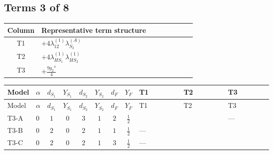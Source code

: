 \documentclass[8pt]{article}
\begin{document}
\begin{landscape}
\subsection*{Terms 3 of 8}
\begin{center}
\begin{tabular}{@{}c >{\raggedright\arraybackslash}p{0.82\linewidth}@{}}
\toprule
Column & Representative term structure \\
\midrule
T1 & \(\displaystyle +4 {\lambda_{12}^{(1)}} {\lambda_{S_2}^{(A)}}\) \\
\midrule
T2 & \(\displaystyle +4 {\lambda_{HS_1}^{(1)}} {\lambda_{HS_2}^{(1)}}\) \\
\midrule
T3 & \(\displaystyle +\frac{9 {g_2}^4}{4}\) \\
\midrule
\bottomrule
\end{tabular}
\end{center}
\smallskip
\tiny
\begin{longtable}{@{}llcccccc >{\raggedright\arraybackslash}p{0.21\linewidth} >{\raggedright\arraybackslash}p{0.21\linewidth} >{\raggedright\arraybackslash}p{0.21\linewidth}@{}}
\toprule
Model & $\alpha$ & $d_{S_1}$ & $Y_{S_1}$ & $d_{S_2}$ & $Y_{S_2}$ & $d_F$ & $Y_F$ & T1 & T2 & T3 \\
\midrule
\endfirsthead
\toprule
Model & $\alpha$ & $d_{S_1}$ & $Y_{S_1}$ & $d_{S_2}$ & $Y_{S_2}$ & $d_F$ & $Y_F$ & T1 & T2 & T3 \\
\midrule
\endhead
T3-A & $0$ & $1$ & $0$ & $3$ & $1$ & $2$ & $\frac{1}{2}$ & \scriptsize\adjustbox{max width=\linewidth}{$\begin{gathered} +4 {\lambda_{12}^{(1)}} {\lambda_{S_2}^{(A)}}\end{gathered}$} & \scriptsize\adjustbox{max width=\linewidth}{$\begin{gathered} +4 {\lambda_{HS_1}^{(1)}} {\lambda_{HS_2}^{(1)}}\end{gathered}$} & --- \\
\midrule
T3-B & $0$ & $2$ & $0$ & $2$ & $1$ & $1$ & $\frac{1}{2}$ & --- & \scriptsize\adjustbox{max width=\linewidth}{$\begin{gathered} +4 {\lambda_{HS_1}^{(1)}} {\lambda_{HS_2}^{(1)}}\end{gathered}$} & \scriptsize\adjustbox{max width=\linewidth}{$\begin{gathered} +\frac{9 {g_2}^4}{4}\end{gathered}$} \\
\midrule
T3-C & $0$ & $2$ & $0$ & $2$ & $1$ & $3$ & $\frac{1}{2}$ & --- & \scriptsize\adjustbox{max width=\linewidth}{$\begin{gathered} +4 {\lambda_{HS_1}^{(1)}} {\lambda_{HS_2}^{(1)}}\end{gathered}$} & \scriptsize\adjustbox{max width=\linewidth}{$\begin{gathered} +\frac{9 {g_2}^4}{4}\end{gathered}$} \\

\end{longtable}
\end{landscape}
\end{document}

